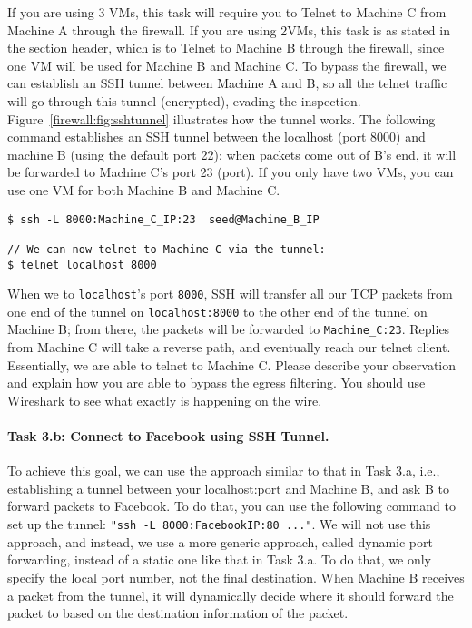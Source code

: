 If you are using 3 VMs, this task will require you to Telnet to Machine C
from Machine A through the firewall. If you are using 2VMs, this task is as stated
in the section header, which is to Telnet to Machine B through the firewall, since
one VM will be used for Machine B and Machine C.
To bypass the firewall, we can establish an SSH tunnel between
Machine A and B, so all the telnet traffic will go through this tunnel
(encrypted), evading the inspection. Figure~\ref{firewall:fig:sshtunnel}
illustrates how the tunnel works. 
The following command 
establishes an SSH tunnel between the localhost (port 8000) and 
machine B (using the default port 22); when packets come out of B's end, it will
be forwarded to Machine C's port 23 (\telnet port). If you only have two VMs,
you can use one VM for both Machine B and Machine C.


\begin{lstlisting}
$ ssh -L 8000:Machine_C_IP:23  seed@Machine_B_IP

// We can now telnet to Machine C via the tunnel:
$ telnet localhost 8000
\end{lstlisting}

When we \telnet to \texttt{localhost}'s port \texttt{8000},  
SSH will transfer all our TCP packets from
one end of the tunnel on \texttt{localhost:8000} to the other end of the tunnel
on Machine B; from there,
the packets will be forwarded to \texttt{Machine\_C:23}. Replies from Machine C will
take a reverse path, and eventually reach our telnet client.
Essentially, we are able to telnet to Machine C.
Please describe your observation and explain how you are able to 
bypass the egress filtering. You should use Wireshark to see
what exactly is happening on the wire.



\paragraph{Task 3.b: Connect to Facebook using SSH Tunnel.}
To achieve this goal, we can use the approach similar to that in 
Task 3.a, i.e., establishing a tunnel between your localhost:port
and Machine B, and ask B to forward packets to Facebook. To do 
that, you can use the following command to set up the tunnel:
{\tt "ssh -L 8000:FacebookIP:80 ..."}. 
We will not use this approach, and instead, we 
use a more generic approach, called dynamic port forwarding, instead of a static one
like that in Task 3.a. To do that, we only specify the local
port number, not the final destination. When Machine B receives
a packet from the tunnel, it will dynamically decide where it should 
forward the packet to based on the destination information of
the packet.


